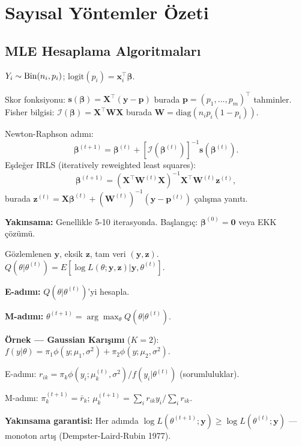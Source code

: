 \section{Sayısal Yöntemler Özeti}
\label{app:sayisal_ozet}

\subsection{MLE Hesaplama Algoritmaları}

\begin{ornek}
$Y_i\sim\operatorname{Bin}(n_i,p_i)$; $\mathrm{logit}(p_i)=\mathbf{x}_i^\top\boldsymbol\beta$.

Skor fonksiyonu: $\mathbf{s}(\boldsymbol\beta)=\mathbf{X}^\top(\mathbf{y}-\mathbf{p})$ burada $\mathbf{p}=(p_1,\ldots,p_m)^\top$ tahminler.
Fisher bilgisi: $\mathcal{I}(\boldsymbol\beta)=\mathbf{X}^\top\mathbf{W}\mathbf{X}$ burada $\mathbf{W}=\mathrm{diag}(n_ip_i(1-p_i))$.

Newton-Raphson adımı:
\[
  \boldsymbol\beta^{(t+1)} = \boldsymbol\beta^{(t)} + [\mathcal{I}(\boldsymbol\beta^{(t)})]^{-1}\mathbf{s}(\boldsymbol\beta^{(t)}).
\]
Eşdeğer IRLS (iteratively reweighted least squares):
\[
  \boldsymbol\beta^{(t+1)} = (\mathbf{X}^\top\mathbf{W}^{(t)}\mathbf{X})^{-1}\mathbf{X}^\top\mathbf{W}^{(t)}\mathbf{z}^{(t)},
\]
burada $\mathbf{z}^{(t)}=\mathbf{X}\boldsymbol\beta^{(t)}+(\mathbf{W}^{(t)})^{-1}(\mathbf{y}-\mathbf{p}^{(t)})$ çalışma yanıtı.

\textbf{Yakınsama:} Genellikle 5-10 iterasyonda. Başlangıç: $\boldsymbol\beta^{(0)}=\mathbf{0}$ veya EKK çözümü.
\end{ornek}

\begin{ornek}
Gözlemlenen $\mathbf{y}$, eksik $\mathbf{z}$, tam veri $(\mathbf{y},\mathbf{z})$. $Q(\theta|\theta^{(t)})=E[\log L(\theta;\mathbf{y},\mathbf{z})|\mathbf{y},\theta^{(t)}]$.

\textbf{E-adımı:} $Q(\theta|\theta^{(t)})$'yi hesapla.

\textbf{M-adımı:} $\theta^{(t+1)}=\arg\max_\theta Q(\theta|\theta^{(t)})$.

\textbf{Örnek --- Gaussian Karışımı} ($K=2$): $f(y|\theta)=\pi_1\phi(y;\mu_1,\sigma^2)+\pi_2\phi(y;\mu_2,\sigma^2)$.

E-adımı: $r_{ik}=\pi_k\phi(y_i;\mu_k^{(t)},\sigma^2)/f(y_i|\theta^{(t)})$ (sorumluluklar).

M-adımı: $\pi_k^{(t+1)}=\bar r_k$; $\mu_k^{(t+1)}=\sum_i r_{ik}y_i/\sum_i r_{ik}$.

\textbf{Yakınsama garantisi:} Her adımda $\log L(\theta^{(t+1)};\mathbf{y})\geq\log L(\theta^{(t)};\mathbf{y})$ --- monoton artış (Dempster-Laird-Rubin 1977).
\end{ornek}

